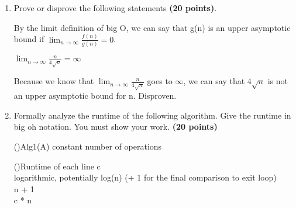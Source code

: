 \documentclass[11pt]{amsart}
\begin{document}
\begin{enumerate}

\item Prove or disprove the following statements \textbf{(20 points)}.
\begin{enumerate}
	By the limit definition of big O, we can say that g(n) is an upper asymptotic bound if $\lim_{n\to\infty} \frac{f(n)}{g(n)} = 0$.\\
	\begin{center}
		$\lim_{n\to\infty} \frac{n}{4\sqrt{n}} = \infty$
	\end{center}
	Because we know that $\lim_{n\to\infty} \frac{n}{4\sqrt{n}}$ goes to $\infty$, we can say that $4\sqrt{n}$ is not an upper asymptotic bound for n. Disproven.
\end{enumerate}

\newpage

\item Formally analyze the runtime of the following algorithm. Give the runtime in big oh notation. You must show your work. \textbf{(20 points)}

\smallskip

\begin{algorithm}[H]
\Fn(){Alg1(A)}{
\SetAlgoLined
\SetNoFillComment
\DontPrintSemicolon
	constant number of operations \\
}
\end{algorithm}

\begin{algorithm}[H]
	\Fn(){Runtime of each line}{
	\SetAlgoLined
	\SetNoFillComment
	\DontPrintSemicolon
		c\\
		logarithmic, potentially log(n) (+ 1 for the final comparison to exit loop)\\
		n + 1\\
		c * n\\
	}
\end{algorithm}


\end{enumerate}
\end{document}
